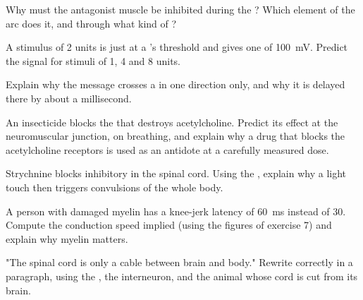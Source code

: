 \begin{exercise}[$\star\star$]\label{exo:g12:stretch-reflex:9}
Why must the antagonist muscle be inhibited during the ? Which
element of the arc does it, and through what kind of ?
\end{exercise}

\begin{exercise}[$\star\star$]\label{exo:g12:stretch-reflex:10}
A stimulus of 2 units is just at a 's threshold and gives one
 of \qty{100}{mV}. Predict the signal for stimuli of 1,
4 and 8 units.
\end{exercise}

\begin{exercise}[$\star\star$]\label{exo:g12:stretch-reflex:11}
Explain why the message crosses a  in one direction only, and
why it is delayed there by about a millisecond.
\end{exercise}

\begin{exercise}[$\star\star\star$]\label{exo:g12:stretch-reflex:12}
An insecticide blocks the  that destroys acetylcholine. Predict
its effect at the neuromuscular junction, on breathing, and explain
why a drug that blocks the acetylcholine receptors is used as an
antidote at a carefully measured dose.
\end{exercise}

\begin{exercise}[$\star\star\star$]\label{exo:g12:stretch-reflex:13}
Strychnine blocks inhibitory  in the spinal cord. Using the
, explain why a light touch then triggers convulsions of
the whole body.
\end{exercise}

\begin{exercise}[$\star\star\star$]\label{exo:g12:stretch-reflex:14}
A person with damaged myelin has a knee-jerk latency of \qty{60}{ms}
instead of 30. Compute the conduction speed implied (using the
figures of exercise 7) and explain why myelin matters.
\end{exercise}

\begin{exercise}[$\star\star\star$]\label{exo:g12:stretch-reflex:15}
"The spinal cord is only a cable between brain and body." Rewrite
correctly in a paragraph, using the , the interneuron, and the
animal whose cord is cut from its brain.
\end{exercise}

